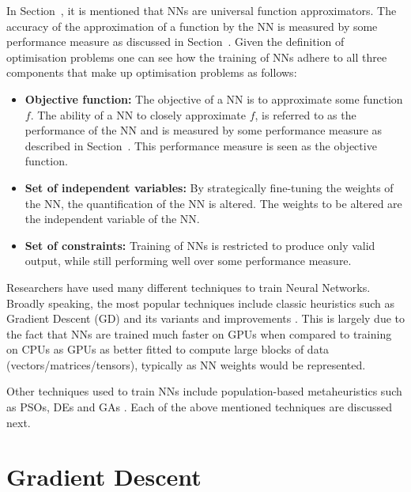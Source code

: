 In Section~, it is mentioned that NNs are universal function approximators. The accuracy of the approximation of a function by the NN is measured by some performance measure as discussed in Section~. Given the definition of optimisation problems one can see how the training of NNs adhere to all three components that make up optimisation problems as follows:

\begin{itemize}
  \item \textbf{Objective function:} The objective of a NN is to approximate some function $f$. The ability of a NN to closely approximate $f$, is referred to as the performance of the NN and is  measured by some performance measure as described in Section~. This performance measure is seen as the objective function.
  \item \textbf{Set of independent variables:} By strategically fine-tuning the weights of the NN, the quantification of the NN is altered. The weights to be altered are the independent variable of the NN.
  \item \textbf{Set of constraints:} Training of NNs is restricted to produce only valid output, while still performing well over some performance measure.
\end{itemize} 

Researchers have used many different techniques to train Neural Networks. Broadly speaking, the most popular techniques include classic heuristics such as Gradient Descent (GD) and its variants and improvements . This is largely due to the fact that NNs are trained much faster on GPUs when compared to training on CPUs  as GPUs as better fitted to compute large blocks of data (vectors/matrices/tensors), typically as NN weights would be represented.

Other techniques used to train NNs include population-based metaheuristics such as PSOs, DEs and GAs . Each of the above mentioned techniques are discussed next.


\section{Gradient Descent}
\label{sec:heuristics:gradient-descent}





